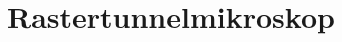 \chapter{Rastertunnelmikroskop\label{chapter:rastertunnelmikroskop}}
\begin{refsection}

\printbibliography[heading=subbibliography]
\end{refsection}

